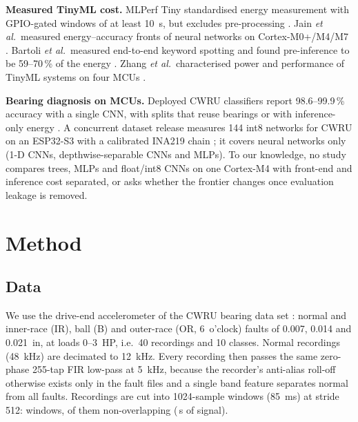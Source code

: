 \documentclass[conference]{IEEEtran}
\begin{document}
\textbf{Measured TinyML cost.} MLPerf Tiny standardised energy measurement with GPIO-gated windows of at least
\SI{10}{s}, but excludes pre-processing \cite{banbury2021mlperf}. Jain \emph{et al.}\ measured energy--accuracy fronts
of neural networks on Cortex-M0+/M4/M7 \cite{jain2025pareto}. Bartoli \emph{et al.}\ measured end-to-end keyword
spotting and found pre-inference to be 59--70\,\% of the energy \cite{bartoli2025benchmarking,bartoli2025endtoend}.
Zhang \emph{et al.}\ characterised power and performance of TinyML systems on four MCUs \cite{zhang2022power}.

\textbf{Bearing diagnosis on MCUs.} Deployed CWRU classifiers report 98.6--99.9\,\% accuracy with a single CNN, with
splits that reuse bearings or with inference-only energy \cite{elboughardini2026effective,gao2025edge}. A concurrent
dataset release measures 144 int8 networks for CWRU on an ESP32-S3 with a calibrated INA219 chain
\cite{gupta2026measured}; it covers neural networks only (1-D CNNs, depthwise-separable CNNs and MLPs). To our
knowledge, no study compares trees, MLPs and float/int8 CNNs on one Cortex-M4 with front-end and inference cost
separated, or asks whether the frontier changes once evaluation leakage is removed.

\section{Method}
\subsection{Data}
We use the drive-end accelerometer of the CWRU bearing data set \cite{cwru,smith2015rolling}: normal and inner-race (IR), ball (B) and outer-race
(OR, 6~o'clock) faults of 0.007, 0.014 and 0.021~in, at loads 0--3~HP, i.e.\ 40 recordings and 10 classes. Normal
recordings (\SI{48}{kHz}) are decimated to \SI{12}{kHz}. Every recording then passes the same zero-phase 255-tap FIR
low-pass at \SI{5}{kHz}, because the recorder's anti-alias roll-off otherwise exists only in the fault files and a
single band feature separates normal from all faults. Recordings are cut into 1024-sample windows (\SI{85}{ms}) at
stride 512: \NumWindows{} windows, \NumWindowsNO{} of them non-overlapping (\NumSignalS{}\,s of signal).
\end{document}
